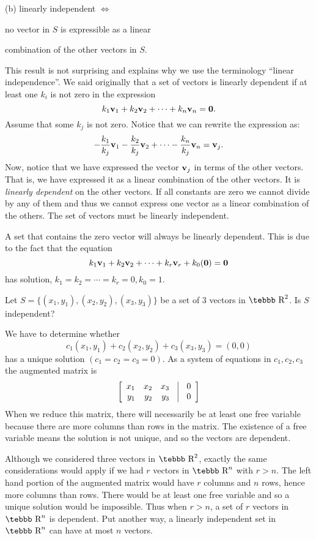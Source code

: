 \parbox{2in}{(b) linearly independent $\Leftrightarrow$}
\parbox[t]{4in}{ no vector in $S$ is expressible as a linear

 combination of the other vectors in $S$.}

\vspace{4mm}
This result is not surprising and explains why we use the
terminology ``linear independence''.  We said originally that a
set of vectors is linearly dependent if at least one $k_i$ is not
zero in the expression $$k_1{\bf v}_1+k_2{\bf v}_2+\cdots+k_n{\bf
v}_n={\bf 0}.$$ Assume that some $k_j$ is not zero. Notice that we
can rewrite the expression as:$$-\frac{k_1}{k_j}{\bf
v}_1-\frac{k_2}{k_j}{\bf v}_2+\cdots- \frac{k_{n}}{k_j}{\bf
v}_{n}={\bf v}_j.$$ Now, notice that we have expressed the vector
${\bf v}_j$ in terms of the other vectors. That is, we have
expressed it as a linear combination of the other vectors. It is
\textit{linearly dependent} on the other vectors. If all constants
are zero we cannot divide by any of them and thus we cannot
express one vector as a linear combination of the others. The set
of vectors must be linearly independent.

A set that contains the zero vector will always be linearly
dependent.  This is due to the fact that the equation $$k_1{\bf
v}_1+k_2{\bf v}_2+\cdots+k_r{\bf v}_r+k_0({\bf 0})={\bf 0}$$ has
solution, $k_1=k_2=\cdots=k_r=0, k_0=1$.

\begin{example}
\label{exam5.li4}
Let $S=\{(x_1,y_1),(x_2,y_2),(x_3,y_3)\}$ be a set
of 3 vectors in $\mbox{\tebbb R}^2$.  Is $S$ independent?

We have to determine whether
$$c_1(x_1,y_1)+c_2(x_2,y_2)+c_3(x_3,y_3)=(0,0)$$
has a unique solution $(c_1=c_2=c_3=0)$.  As a system of equations in $c_1, c_2, c_3$ the augmented matrix is
$$\left [\begin{array}{rrrcr} x_1&x_2&x_3&\vline&0\\
y_1&y_2&y_3&\vline&0\end{array}\right]$$
When we reduce this matrix, there will necessarily be at least one free variable because there are more columns than rows in the matrix.  The existence of a free variable means the solution is not unique, and so the vectors are dependent.
\end{example}

Although we considered three vectors in $\mbox{\tebbb R}^2$, exactly the same considerations would apply if we had $r$ vectors in $\mbox{\tebbb R}^n$ with $r>n$.  The left hand portion of the augmented matrix would have $r$ columns and $n$ rows, hence more columns than rows.  There would be at least one free variable and so a unique solution would be impossible.  Thus when $r>n$, a set of $r$ vectors in $\mbox{\tebbb R}^n$ is dependent.  Put another way, a linearly independent set in $\mbox{\tebbb R}^n$ can have at most $n$ vectors.

